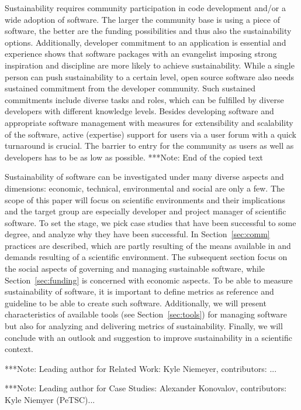 \documentclass[11pt, oneside]{amsart}
\newcommand{\note}[1]{ {\textcolor{blueish}    { ***Note:      #1 }}}
\begin{document}
Sustainability requires community participation in code development and/or a
wide adoption of software. The larger the community base is using a piece of
software, the better are the funding possibilities and thus also the
sustainability options. Additionally, developer commitment to an application is
essential and experience shows that software packages with an evangelist
imposing strong inspiration and discipline are more likely to achieve
sustainability. While a single person can push sustainability to a certain
level, open source software also needs sustained commitment from the developer
community. Such sustained commitments include diverse tasks and roles, which can
be fulfilled by diverse developers with different knowledge levels. Besides
developing software and appropriate software management with measures for
extensibility and scalability of the software, active (expertise) support for
users via a user forum with a quick turnaround is crucial. The barrier to entry
for the community as users as well as developers has to be as low as possible.
\note{End of the copied text}

Sustainability of software can be investigated under many diverse aspects and dimensions: 
economic, technical, environmental and social are only a few. The scope of this paper will focus 
on scientific environments and their implications and the target group are especially developer 
and project manager of scientific software. To set the stage, we pick case studies that have been 
successful to some degree, and analyze why they have been successful. In Section~\ref{sec:comm}  
practices are described, which are partly resulting of the means available in and demands resulting of a scientific environment. 
The subsequent section focus on the social aspects of governing and managing sustainable software, 
while Section~\ref{sec:funding} is concerned with economic aspects. To be able to measure sustainability of 
software, it is important to define metrics as reference and guideline to be able to create such 
software. Additionally, we will present characteristics of available tools (see Section~\ref{sec:tools}) 
for managing software but also for analyzing and delivering metrics of sustainability. Finally, 
we will conclude with an outlook and suggestion to improve sustainability in a scientific context.  

\note{Leading author for Related Work: Kyle Niemeyer, contributors: ...}


\note{Leading author for Case Studies: Alexander Konovalov, contributors: Kyle Niemyer (PeTSC)...}

\end{document}
